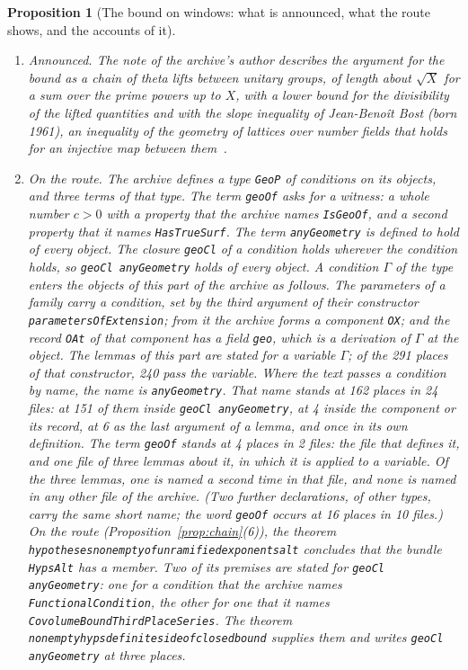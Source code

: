 \documentclass[11pt]{article}
\newtheorem{proposition}[theorem]{Proposition}
\theoremstyle{definition}
\theoremstyle{remark}
\DeclareRobustCommand{\lean}[1]{{\renewcommand{\_}{\textunderscore\allowbreak}\texttt{#1}}}
\begin{document}
\begin{proposition}[The bound on windows: what is announced, what the route shows, and the accounts of it]\label{prop:bound}
\leavevmode
\begin{enumerate}[leftmargin=2em,itemsep=1pt]
\item \emph{Announced.} The note of the archive's author describes the argument for the bound as a chain of theta lifts between unitary groups, of length about $\sqrt X$ for a sum over the prime powers up to $X$, with a lower bound for the divisibility of the lifted quantities and with the slope inequality of Jean-Beno\^it Bost (born 1961), an inequality of the geometry of lattices over number fields that holds for an injective map between them~\citep{alpoge,bost96,riemannrev}.
\item \emph{On the route.} The archive defines a type \lean{GeoP} of conditions on its objects, and three terms of that type. The term \lean{geoOf} asks for a witness: a whole number $c>0$ with a property that the archive names \lean{IsGeoOf}, and a second property that it names \lean{HasTrueSurf}. The term \lean{anyGeometry} is defined to hold of every object. The closure \lean{geoCl} of a condition holds wherever the condition holds, so \lean{geoCl anyGeometry} holds of every object. A condition $\Gamma$ of the type enters the objects of this part of the archive as follows. The parameters of a family carry a condition, set by the third argument of their constructor \lean{parametersOfExtension}; from it the archive forms a component \lean{OX}; and the record \lean{OAt} of that component has a field \lean{geo}, which is a derivation of $\Gamma$ at the object. The lemmas of this part are stated for a variable $\Gamma$; of the 291 places of that constructor, 240 pass the variable. Where the text passes a condition by name, the name is \lean{anyGeometry}. That name stands at 162 places in 24 files: at 151 of them inside \lean{geoCl anyGeometry}, at 4 inside the component or its record, at 6 as the last argument of a lemma, and once in its own definition. The term \lean{geoOf} stands at 4 places in 2 files: the file that defines it, and one file of three lemmas about it, in which it is applied to a variable. Of the three lemmas, one is named a second time in that file, and none is named in any other file of the archive. (Two further declarations, of other types, carry the same short name; the word \lean{geoOf} occurs at 16 places in 10 files.) On the route (Proposition~\ref{prop:chain}(6)), the theorem \lean{hypotheses\_nonempty\_of\_unramified\_exponents\_alt} concludes that the bundle \lean{HypsAlt} has a member. Two of its premises are stated for \lean{geoCl anyGeometry}: one for a condition that the archive names \lean{FunctionalCondition}, the other for one that it names \lean{CovolumeBoundThirdPlaceSeries}. The theorem \lean{nonempty\_hyps\_definite\_side\_of\_closed\_bound} supplies them and writes \lean{geoCl anyGeometry} at three places.

\end{enumerate}
\end{proposition}
\end{document}
